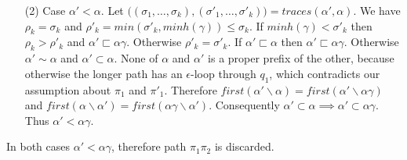 \documentclass[AMA,STIX1COL]{WileyNJD-v2}
\begin{document}
\begin{proofEnd}
\begin{itemize}[itemsep=0.5em, topsep=0.5em]
    \item[(2)]
        Case $\alpha' < \alpha$.
        Let $\big( (\sigma_1, \hdots, \sigma_k), (\sigma'_1, \hdots, \sigma'_k) \big) = traces (\alpha', \alpha)$.
        We have $\rho_k = \sigma_k$ and $\rho'_k = min (\sigma'_k, minh(\gamma)) \leq \sigma_k$.
        If $minh(\gamma) < \sigma'_k$ then $\rho_k > \rho'_k$ and $\alpha' \sqsubset \alpha \gamma$.
        Otherwise $\rho'_k = \sigma'_k$.
        If $\alpha' \sqsubset \alpha$ then $\alpha' \sqsubset \alpha \gamma$.
        Otherwise $\alpha' \sim \alpha$ and $\alpha' \subset \alpha$.
        None of $\alpha$ and $\alpha'$ is a proper prefix of the other,
        because otherwise the longer path has an $\epsilon$-loop through $q_1$, which contradicts our assumption about $\pi_1$ and $\pi'_1$.
        Therefore $first (\alpha' \backslash \alpha) = first (\alpha' \backslash \alpha \gamma)$
        and $first (\alpha \backslash \alpha') = first (\alpha \gamma \backslash \alpha')$.
        Consequently $\alpha' \subset \alpha \implies \alpha' \subset \alpha \gamma$.
        Thus $\alpha' < \alpha \gamma$.
    \end{itemize}
    In both cases $\alpha' < \alpha \gamma$, therefore path $\pi_1 \pi_2$ is discarded.
\end{proofEnd}
\vspace{-0.5em}
\end{document}
